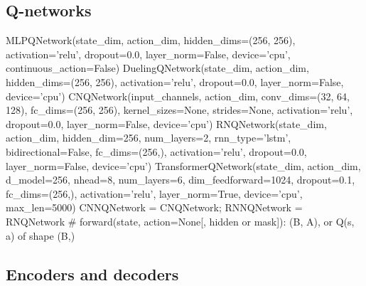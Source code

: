 \subsection{Q-networks}

\begin{pycode}
MLPQNetwork(state_dim, action_dim, hidden_dims=(256, 256), activation='relu',
            dropout=0.0, layer_norm=False, device='cpu', continuous_action=False)
DuelingQNetwork(state_dim, action_dim, hidden_dims=(256, 256),
                activation='relu', dropout=0.0, layer_norm=False, device='cpu')
CNQNetwork(input_channels, action_dim, conv_dims=(32, 64, 128),
           fc_dims=(256, 256), kernel_sizes=None, strides=None,
           activation='relu', dropout=0.0, layer_norm=False, device='cpu')
RNQNetwork(state_dim, action_dim, hidden_dim=256, num_layers=2, rnn_type='lstm',
           bidirectional=False, fc_dims=(256,), activation='relu', dropout=0.0,
           layer_norm=False, device='cpu')
TransformerQNetwork(state_dim, action_dim, d_model=256, nhead=8, num_layers=6,
                    dim_feedforward=1024, dropout=0.1, fc_dims=(256,),
                    activation='relu', layer_norm=True, device='cpu',
                    max_len=5000)
CNNQNetwork = CNQNetwork; RNNQNetwork = RNQNetwork
# forward(state, action=None[, hidden or mask]): (B, A), or Q(s, a) of shape (B,)
\end{pycode}

\subsection{Encoders and decoders}

